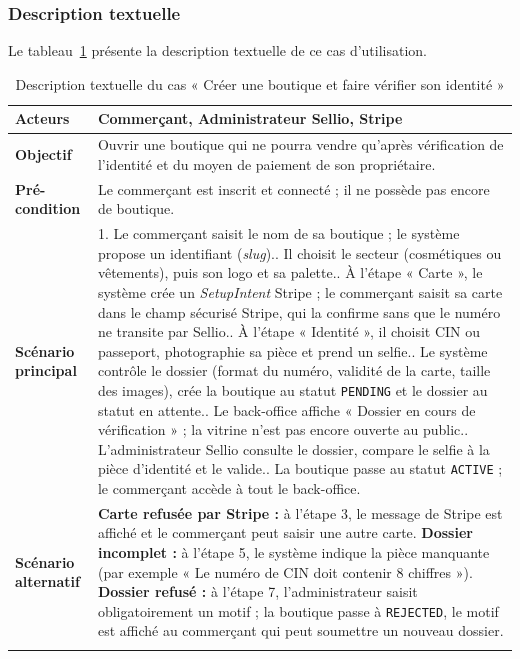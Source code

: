 \subsubsection{Description textuelle}
Le tableau~\ref{tab:uc-kyc} présente la description textuelle de ce cas d'utilisation.
\renewcommand{\arraystretch}{1.5}
\begin{longtable}{|p{4cm}|p{11cm}|}
\hline
\textbf{Acteurs} & Commerçant, Administrateur Sellio, Stripe \\
\hline
\textbf{Objectif} & Ouvrir une boutique qui ne pourra vendre qu'après vérification de l'identité et du moyen de paiement de son propriétaire. \\
\hline
\textbf{Pré-condition} & Le commerçant est inscrit et connecté ; il ne possède pas encore de boutique. \\
\hline
\textbf{Scénario principal} &
1. Le commerçant saisit le nom de sa boutique ; le système propose un identifiant (\textit{slug}).\newline
2. Il choisit le secteur (cosmétiques ou vêtements), puis son logo et sa palette.\newline
3. À l'étape « Carte », le système crée un \textit{SetupIntent} Stripe ; le commerçant saisit sa carte dans le champ sécurisé Stripe, qui la confirme sans que le numéro ne transite par Sellio.\newline
4. À l'étape « Identité », il choisit CIN ou passeport, photographie sa pièce et prend un selfie.\newline
5. Le système contrôle le dossier (format du numéro, validité de la carte, taille des images), crée la boutique au statut \texttt{PENDING} et le dossier au statut en attente.\newline
6. Le back-office affiche « Dossier en cours de vérification » ; la vitrine n'est pas encore ouverte au public.\newline
7. L'administrateur Sellio consulte le dossier, compare le selfie à la pièce d'identité et le valide.\newline
8. La boutique passe au statut \texttt{ACTIVE} ; le commerçant accède à tout le back-office. \\
\hline
\textbf{Scénario alternatif} &
\textbf{Carte refusée par Stripe :} à l'étape 3, le message de Stripe est affiché et le commerçant peut saisir une autre carte.\newline
\textbf{Dossier incomplet :} à l'étape 5, le système indique la pièce manquante (par exemple « Le numéro de CIN doit contenir 8 chiffres »).\newline
\textbf{Dossier refusé :} à l'étape 7, l'administrateur saisit obligatoirement un motif ; la boutique passe à \texttt{REJECTED}, le motif est affiché au commerçant qui peut soumettre un nouveau dossier. \\
\hline
\caption{Description textuelle du cas « Créer une boutique et faire vérifier son identité »}
\label{tab:uc-kyc}
\end{longtable}


